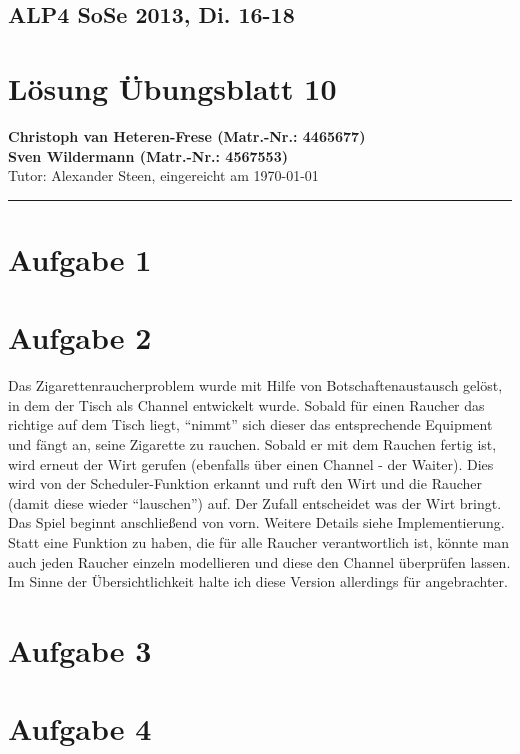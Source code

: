 \documentclass[11pt,a4paper,DIV=10,]{scrartcl}
\begin{document}
\subsection*{ALP4 SoSe 2013, Di. 16-18}
\section*{Lösung Übungsblatt 10}
\textbf{Christoph van Heteren-Frese (Matr.-Nr.: 4465677)} \\ \textbf{Sven Wildermann (Matr.-Nr.: 4567553)}\\
Tutor: Alexander Steen, eingereicht am \today\\
\hrule
\section*{Aufgabe 1}
\section*{Aufgabe 2}
Das Zigarettenraucherproblem wurde mit Hilfe von Botschaftenaustausch gelöst, in dem der Tisch als Channel entwickelt wurde. 
Sobald für einen Raucher das richtige auf dem Tisch liegt, ``nimmt'' sich dieser das entsprechende Equipment und fängt an, seine Zigarette zu rauchen.
Sobald er mit dem Rauchen fertig ist, wird erneut der Wirt gerufen (ebenfalls über einen Channel - der Waiter). Dies wird von der Scheduler-Funktion erkannt und ruft den Wirt und die Raucher (damit diese wieder ``lauschen'') auf. 
Der Zufall entscheidet was der Wirt bringt. Das Spiel beginnt anschließend von vorn. Weitere Details siehe Implementierung. \\

Statt eine Funktion zu haben, die für alle Raucher verantwortlich ist, könnte man auch jeden Raucher einzeln modellieren und diese den Channel überprüfen lassen. Im Sinne der Übersichtlichkeit halte ich diese Version allerdings für angebrachter. 




\section*{Aufgabe 3}
\section*{Aufgabe 4}


\end{document}
